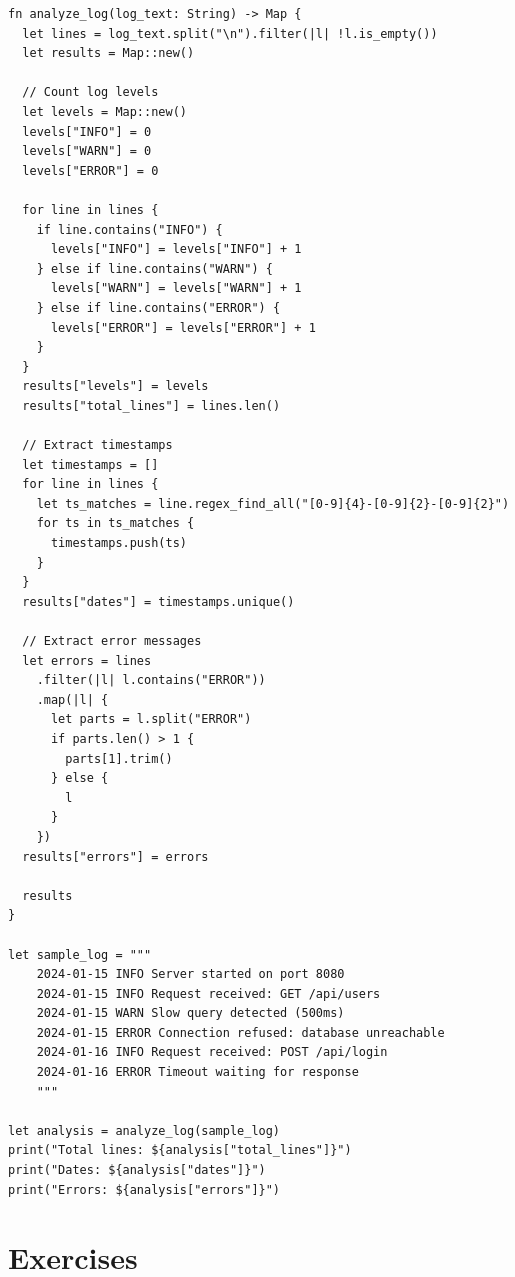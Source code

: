 \begin{lstlisting}[language=Lattice, caption={A log file analyzer}]
fn analyze_log(log_text: String) -> Map {
  let lines = log_text.split("\n").filter(|l| !l.is_empty())
  let results = Map::new()

  // Count log levels
  let levels = Map::new()
  levels["INFO"] = 0
  levels["WARN"] = 0
  levels["ERROR"] = 0

  for line in lines {
    if line.contains("INFO") {
      levels["INFO"] = levels["INFO"] + 1
    } else if line.contains("WARN") {
      levels["WARN"] = levels["WARN"] + 1
    } else if line.contains("ERROR") {
      levels["ERROR"] = levels["ERROR"] + 1
    }
  }
  results["levels"] = levels
  results["total_lines"] = lines.len()

  // Extract timestamps
  let timestamps = []
  for line in lines {
    let ts_matches = line.regex_find_all("[0-9]{4}-[0-9]{2}-[0-9]{2}")
    for ts in ts_matches {
      timestamps.push(ts)
    }
  }
  results["dates"] = timestamps.unique()

  // Extract error messages
  let errors = lines
    .filter(|l| l.contains("ERROR"))
    .map(|l| {
      let parts = l.split("ERROR")
      if parts.len() > 1 {
        parts[1].trim()
      } else {
        l
      }
    })
  results["errors"] = errors

  results
}

let sample_log = """
    2024-01-15 INFO Server started on port 8080
    2024-01-15 INFO Request received: GET /api/users
    2024-01-15 WARN Slow query detected (500ms)
    2024-01-15 ERROR Connection refused: database unreachable
    2024-01-16 INFO Request received: POST /api/login
    2024-01-16 ERROR Timeout waiting for response
    """

let analysis = analyze_log(sample_log)
print("Total lines: ${analysis["total_lines"]}")
print("Dates: ${analysis["dates"]}")
print("Errors: ${analysis["errors"]}")
\end{lstlisting}

\section{Exercises}\label{sec:strings-exercises}

